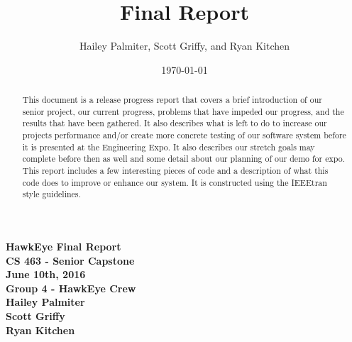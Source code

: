 \documentclass[letterpaper,10pt,titlepage]{IEEEtran}
\title{Final Report}
\author{Hailey Palmiter, Scott Griffy, and Ryan Kitchen}
\date{\today}
\begin{document}
   \begin{titlepage}
      \centering
      \vfill
      {\bfseries\Large
         HawkEye Final Report \\
         CS 463 - Senior Capstone\\
         \vskip2cm
         June 10th, 2016\\
         \vskip2cm
         Group 4 - HawkEye Crew\\ 
         \vskip1cm
         Hailey Palmiter\\
         \vskip1cm
         Scott Griffy\\
         \vskip1cm
         Ryan Kitchen\\
    
      }
      \vfill
      \vskip2cm
      \begin{abstract}
      This document is a release progress report that covers a brief introduction of our senior project, our current progress, problems that have impeded our progress, and the results that have been gathered. It also describes what is left to do to increase our projects performance and/or create more concrete testing of our software system before it is presented at the Engineering Expo. It also describes our stretch goals may complete before then as well and some detail about our planning of our demo for expo. This report includes a few interesting pieces of code and a description of what this code does to improve or enhance our system. It is constructed using the IEEEtran style guidelines.
      \end{abstract}
      \vfill
   \end{titlepage}
   
   \onecolumn
   \tableofcontents
   \newpage
   \bigskip
\end{document}
